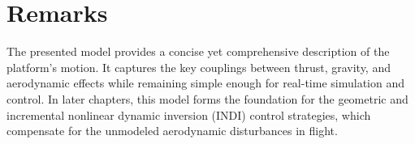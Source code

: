 \section{Remarks}
The presented model provides a concise yet comprehensive description of the platform's motion.  
It captures the key couplings between thrust, gravity, and aerodynamic effects while remaining simple enough for real-time simulation and control.  
In later chapters, this model forms the foundation for the geometric and incremental nonlinear dynamic inversion (INDI) control strategies, which compensate for the unmodeled aerodynamic disturbances in flight.


